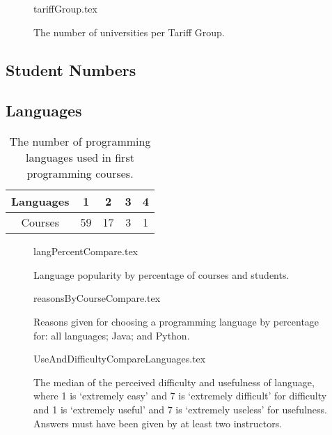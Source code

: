 \documentclass{sig-alternate}
\begin{document}
\begin{figure}
\begin{center}
{tariffGroup.tex}
\caption{The number of universities per Tariff Group.}
\end{center}
\end{figure}

\subsection{Student Numbers}

\subsection{Languages}

\begin{table}[]
\centering
\caption{The number of programming languages used in first programming courses.}
\label{tab:numLanguages}
\begin{tabular}{ccccc}
\hline
Languages & 1  & 2  & 3 & 4 \\ \hline
Courses   & 59 & 17 & 3 & 1 \\ \hline
\end{tabular}
\end{table}

\begin{figure}
\begin{center}
{langPercentCompare.tex}
\end{center}
\caption{Language popularity by percentage of courses and students.}
\end{figure}

\begin{figure}
\begin{center}
{reasonsByCourseCompare.tex}
\end{center}
\caption{Reasons given for choosing a programming language by percentage for: all languages; Java; and Python.}
\end{figure}


\begin{figure}
\begin{center}
{UseAndDifficultyCompareLanguages.tex}
\end{center}
\caption{The median of the perceived difficulty and usefulness of language, where 1 is `extremely easy' and 7 is `extremely difficult' for difficulty and 1 is `extremely useful' and 7 is `extremely useless' for usefulness.  Answers must have been given by at least two instructors.}
\end{figure}
\end{document}

